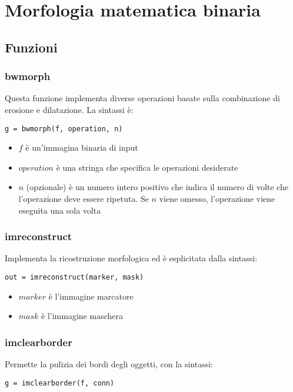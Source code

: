 \chapter{Morfologia matematica binaria}

\section{Funzioni}

\subsection{bwmorph}
Questa funzione implementa diverse operazioni basate sulla combinazione di erosione e dilatazione. La sintassi è:
\begin{lstlisting}
g = bwmorph(f, operation, n)
\end{lstlisting}

\begin{itemize}
	\item $f$ è un'immagina binaria di input
	\item $operation$ è una stringa che specifica le operazioni desiderate
	\item $n$ (opzionale) è un numero intero positivo che indica il numero di volte che l'operazione deve essere ripetuta. Se $n$ viene omesso, l'operazione viene eseguita una sola volta
\end{itemize}

\subsection{imreconstruct}
Implementa la ricostruzione morfologica ed è esplicitata dalla sintassi:
\begin{lstlisting}
out = imreconstruct(marker, mask)
\end{lstlisting}

\begin{itemize}
	\item $marker$ è l'immagine marcatore
	\item $mask$ è l'immagine maschera
\end{itemize}

\subsection{imclearborder}
Permette la pulizia dei bordi degli oggetti, con la sintassi:
\begin{lstlisting}
g = imclearborder(f, conn)
\end{lstlisting}

